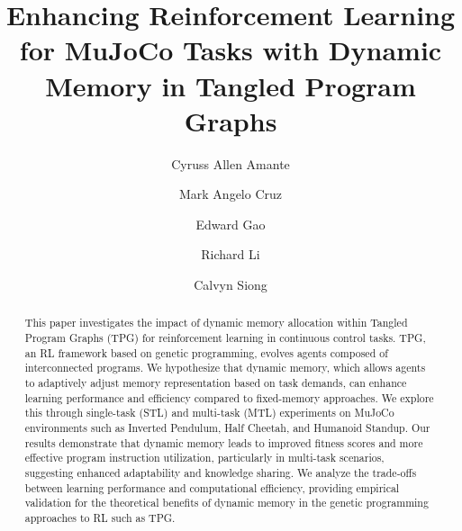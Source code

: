 \documentclass[sigconf]{acmart}
\begin{document}
\title[Dynamic Memory in Tangled Program Graphs]{Enhancing Reinforcement Learning for MuJoCo Tasks with Dynamic Memory in Tangled Program Graphs}

\author{Cyruss Allen Amante}

\author{Mark Angelo Cruz}

\author{Edward Gao}

\author{Richard Li}

\author{Calvyn Siong}



\begin{abstract}
  This paper investigates the impact of dynamic memory allocation within 
  Tangled Program Graphs (TPG) for reinforcement learning in continuous control 
  tasks. TPG, an RL framework based on genetic programming, evolves agents composed of interconnected programs. 
  We hypothesize that dynamic memory, which allows agents to adaptively adjust 
  memory representation based on task demands, can enhance learning performance 
  and efficiency compared to fixed-memory approaches. We explore this through 
  single-task (STL) and multi-task (MTL) experiments on MuJoCo environments such as Inverted 
  Pendulum, Half Cheetah, and Humanoid Standup. Our results demonstrate that dynamic 
  memory leads to improved fitness scores and more effective program instruction utilization, 
  particularly in multi-task scenarios, suggesting enhanced adaptability and knowledge sharing. 
  We analyze the trade-offs between learning performance and computational efficiency, 
  providing empirical validation for the theoretical benefits of dynamic memory in 
  the genetic programming approaches to RL such as TPG.
\end{abstract}
\end{document}

